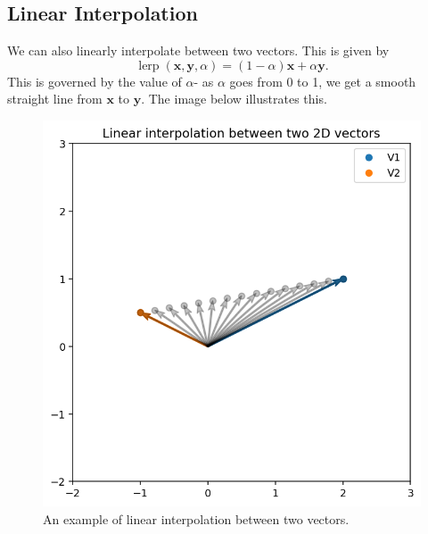 \documentclass[a4paper, openany]{memoir}
\begin{document}
    \subsection{Linear Interpolation}
    We can also linearly interpolate between two vectors. This is given by
    \[\operatorname{lerp}(\mathbf{x}, \mathbf{y}, \alpha) = (1 - \alpha) \mathbf{x} + \alpha \mathbf{y}.\]
    This is governed by the value of $\alpha$- as $\alpha$ goes from 0 to 1, we get a smooth straight line from $\mathbf{x}$ to $\mathbf{y}$. The image below illustrates this.
    \begin{figure}[H]
        \centering
        \includegraphics[scale=0.7]{src/3.1 lerp.png}
        \caption{An example of linear interpolation between two vectors.}
    \end{figure}
\end{document}
